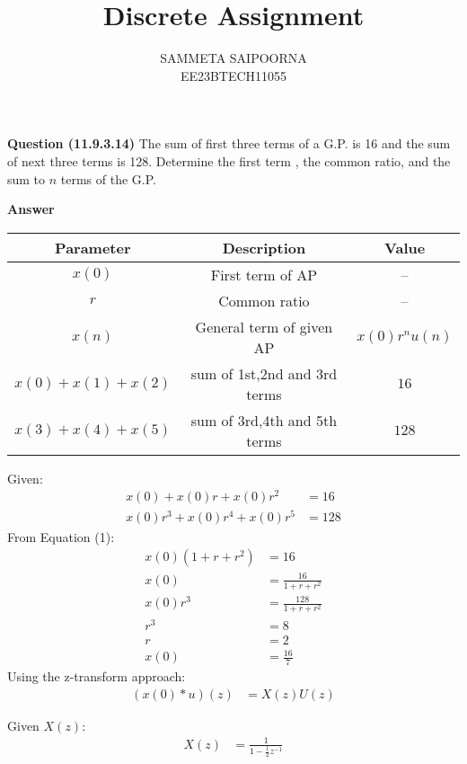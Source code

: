 \documentclass[journal,12pt,onecolumn]{IEEEtran}
\theoremstyle{remark}
\begin{document}
\let\vec\mathbf



\bigskip

\renewcommand{\thefigure}{\theenumi}
\renewcommand{\thetable}{\theenumi}

\title{Discrete Assignment}
\author{SAMMETA SAIPOORNA\\ EE23BTECH11055}
\maketitle
\textbf{Question (11.9.3.14)}
The sum of first three terms of a G.P. is 16 and the sum of next three terms is 128. Determine the first term , the common ratio, and the sum to $n$ terms of the G.P.


\textbf{Answer}


\begin{tabular}{|c|c|c|}
      \hline
      Parameter & Description & Value\\\hline
      $x(0)$ & First term of AP & --\\\hline
      $r$ & Common ratio & --\\\hline
      $x(n)$ & General term of given AP & $x(0)r^nu(n)$\\\hline
      $x(0)+x(1)+x(2)$ & sum of 1st,2nd and 3rd terms & $16$\\\hline
      $x(3)+x(4)+x(5)$ & sum of 3rd,4th and 5th terms & $128$\\\hline
\end{tabular}

Given:
\begin{align}
x(0) + x(0)r + x(0)r^2 &= 16 \\
x(0)r^3 + x(0)r^4 + x(0)r^5 &= 128
\end{align}
From Equation (1):
\begin{align}
x(0)(1 + r + r^2) &= 16 \\
x(0) &= \frac{16}{1 + r + r^2} \\
x(0)r^3 &= \frac{128}{1 + r + r^2} \\
r^3 &= 8 \\
r &= 2 \\
x(0) &= \frac{16}{7}
\end{align}
Using the z-transform approach:
\begin{align}
(x(0) * u)(z) &= X(z)U(z)
\end{align}

Given \(X(z)\):
\begin{align}
X(z) &= \frac{1}{1 - \frac{1}{2}z^{-1}}
\end{align}
\end{document}

